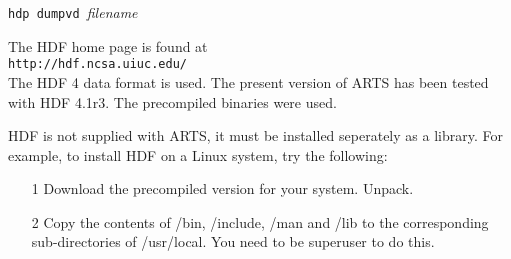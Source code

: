  \verb|hdp dumpvd |{\it filename}



 \label{sec:formats:hdf}

 The HDF home page is found at \\

 \verb|http://hdf.ncsa.uiuc.edu/| \\

 \noindent
 The HDF 4 data format is used. The present version of ARTS has been
 tested with HDF 4.1r3. The precompiled binaries were used.
 
 HDF is not supplied with ARTS, it must be installed seperately as a
 library. For example, to install HDF on a Linux system, try the
 following:
 \begin{itemize}
  \item[1] Download the precompiled version for your system. Unpack.
  \item[2] Copy the contents of /bin, /include, /man and /lib to the 
           corresponding sub-directories of /usr/local. You need to be 
           superuser to do this.  
 \end{itemize}



